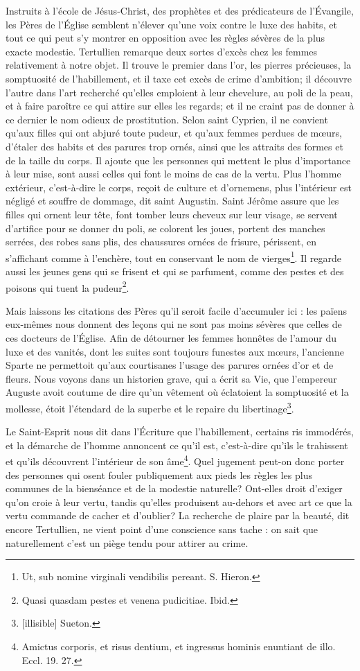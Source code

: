 \documentclass[instructions.tex]{subfiles}
\begin{document}
Instruits à l'école de Jésus-Christ, des prophètes et des prédicateurs de l'Évangile, les Pères de l'Église semblent n'élever qu'une voix contre le luxe des habits, et tout ce qui peut s'y montrer en opposition avec les règles sévères de la plus exacte modestie. Tertullien remarque deux sortes d'excès chez les femmes relativement à notre objet. Il trouve le premier dans l'or, les pierres précieuses, la somptuosité de l'habillement, et il taxe cet excès de crime d'ambition; il découvre l'autre dans l'art recherché qu'elles emploient à leur chevelure, au poli de la peau, et à faire paroître ce qui attire sur elles les regards; et il ne craint pas de donner à ce dernier le nom odieux de prostitution. Selon saint Cyprien, il ne convient qu'aux filles qui ont abjuré toute pudeur, et qu'aux femmes perdues de mœurs, d'étaler des habits et des parures trop ornés, ainsi que les attraits des formes et de la taille du corps. Il ajoute que les personnes qui mettent le plus d'importance à leur mise, sont aussi celles qui font le moins de cas de la vertu. Plus l'homme extérieur, c'est-à-dire le corps, reçoit de culture et d'ornemens, plus l'intérieur est négligé et souffre de dommage, dit saint Augustin. Saint Jérôme assure que les filles qui ornent leur tête, font tomber leurs cheveux sur leur visage, se servent d'artifice pour se donner du poli, se colorent les joues, portent des manches serrées, des robes sans plis, des chaussures ornées de frisure, périssent, en s'affichant comme à l'enchère, tout en conservant le nom de vierges\footnote{Ut, sub nomine virginali vendibilis pereant. S. Hieron.}. Il regarde aussi les jeunes gens qui se frisent et qui se parfument, comme des pestes et des poisons qui tuent la pudeur\footnote{Quasi quasdam pestes et venena pudicitiae. Ibid.}.
 
Mais laissons les citations des Pères qu'il seroit facile d'accumuler ici : les païens eux-mêmes nous donnent des leçons qui ne sont pas moins sévères que celles de ces docteurs de l'Église. Afin de détourner les femmes honnêtes de l'amour du luxe et des vanités, dont les suites sont toujours funestes aux mœurs, l'ancienne Sparte ne permettoit qu'aux courtisanes l'usage des parures ornées d'or et de fleurs. Nous voyons dans un historien grave, qui a écrit sa Vie, que l'empereur Auguste avoit coutume de dire qu'un vêtement où éclatoient la somptuosité et la mollesse, étoit l'étendard de la superbe et le repaire du libertinage\footnote{[illisible] Sueton.}.
 
Le Saint-Esprit nous dit dans l'Écriture que l'habillement, certains ris immodérés, et la démarche de l'homme annoncent ce qu'il est, c'est-à-dire qu'ils le trahissent et qu'ils découvrent l'intérieur de son âme\footnote{Amictus corporis, et risus dentium, et ingressus hominis enuntiant de illo. Eccl. 19. 27.}. Quel jugement peut-on donc porter des personnes qui osent fouler publiquement aux pieds les règles les plus communes de la bienséance et de la modestie naturelle? Ont-elles droit d'exiger qu'on croie à leur vertu, tandis qu'elles produisent au-dehors et avec art ce que la vertu commande de cacher et d'oublier? La recherche de plaire par la beauté, dit encore Tertullien, ne vient point d'une conscience sans tache : on sait que naturellement c'est un piège tendu pour attirer au crime.
 
\end{document}
